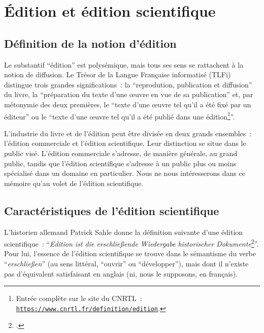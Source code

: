
\section{Édition et édition scientifique}

\subsection{Définition de la notion d'édition}
Le substantif \enquote{édition} est polysémique, mais tous ses sens se rattachent à la notion de diffusion. Le Trésor de la Langue Française informatisé (TLFi) distingue trois grandes significations~: la \enquote{reprodution, publication et diffusion} du livre, la \enquote{préparation du texte d'une \oe{}uvre en vue de sa publication} et, par métonymie des deux premières, le \enquote{texte d'une \oe{}uvre tel qu'il a été fixé par un éditeur} ou le \enquote{texte d'une \oe{}uvre tel qu'il a été publié dans une édition\footnote{Entrée complète sur le site du CNRTL~: \texttt{\href{https://www.cnrtl.fr/definition/edition}{https://www.cnrtl.fr/definition/edition}}.}}.  

L'industrie du livre et de l'édition peut être divisée en deux grands ensembles~: l'édition commerciale et l'édition scientifique. Leur distinction se situe dans le public visé. L'édition commerciale s'adresse, de manière générale, au grand public, tandis que l'édition scientifique s'adresse à un public plus ou moins spécialisé dans un domaine en particulier. Nous ne nous intéresserons dans ce mémoire qu'au volet de l'édition scientifique.  


\subsection{Caractéristiques de l'édition scientifique}
L'historien allemand Patrick Sahle donne la définition suivante d'une édition scientifique~: \enquote{\textit{Edition ist die erschlie\ss{}ende Wiedergabe historischer Dokumente}\footcite[p.~23]{Sahle2016}}. Pour lui, l'essence de l'édition scientifique se trouve dans le sémantisme du verbe \enquote{\textit{erschlie\ss{}en}} (au sens littéral, \enquote{ouvrir} ou \enquote{développer}), mais dont il n'existe pas d'équivalent satisfaisant en anglais (ni, nous le supposons, en français).


